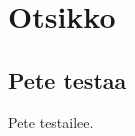 \documentclass{article}
\begin{document}
\section{Otsikko}

\subsection{Pete testaa}

Pete testailee.
\end{document}
